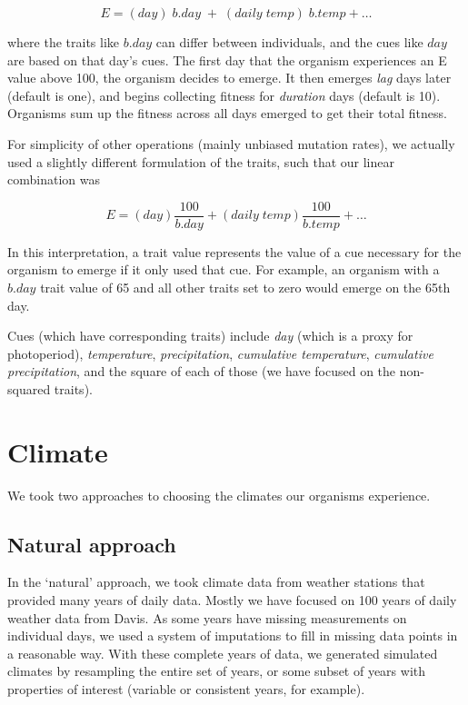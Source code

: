 \documentclass[11pt,a4paper]{article}
\begin{document}
\[E = (day)\;b.day\; + \;(daily\; temp)\;b.temp+\dots\] 

where the traits like $b.day$ can differ between individuals, and the cues like $day$ are based on that day's cues. The first day that the organism experiences an E value above 100, the organism decides to emerge. It then emerges \textit{lag} days later (default is one), and begins collecting fitness for \textit{duration} days (default is 10). Organisms sum up the fitness across all days emerged to get their total fitness. 

For simplicity of other operations (mainly unbiased mutation rates), we actually used a slightly different formulation of the traits, such that our linear combination was

\[E = (day)\frac{100}{b.day} + (daily\; temp)\frac{100}{b.temp}+\dots\] 

In this interpretation, a trait value represents the value of a cue necessary for the organism to emerge if it only used that cue. For example, an organism with a $b.day$ trait value of 65 and all other traits set to zero would emerge on the 65th day.

Cues (which have corresponding traits) include \textit{day} (which is a proxy for photoperiod), \textit{temperature}, \textit{precipitation}, \textit{cumulative temperature}, \textit{cumulative precipitation}, and the square of each of those (we have focused on the non-squared traits). 

\section{Climate}
We took two approaches to choosing the climates our organisms experience. 
\subsection{Natural approach}\label{sec:climate1}
In the `natural' approach, we took climate data from weather stations that provided many years of daily data. Mostly we have focused on 100 years of daily weather data from Davis. As some years have missing measurements on individual days, we used a system of imputations to fill in missing data points in a reasonable way. With these complete years of data, we generated simulated climates by resampling the entire set of years, or some subset of years with properties of interest (variable or consistent years, for example). 
\end{document}
